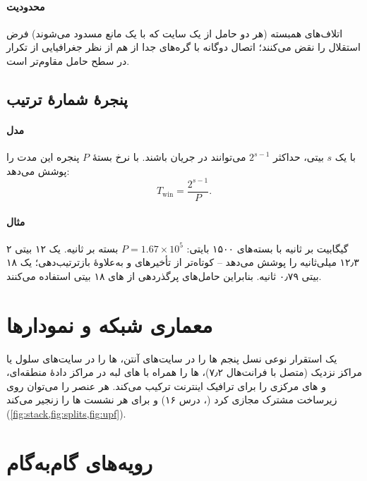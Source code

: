 \documentclass[11pt,a4paper]{article}
\begin{document}
\paragraph{محدودیت} اتلاف‌های همبسته (هر دو حامل از یک سایت که با یک مانع مسدود می‌شوند) فرض استقلال را نقض می‌کنند؛ اتصال دوگانه با گره‌های
جدا از هم از نظر جغرافیایی از تکرار در سطح حامل مقاوم‌تر است.

\subsection{پنجرهٔ شمارهٔ ترتیب}\label{sec:sn}
\paragraph{مدل} با یک  $s$ بیتی، حداکثر $2^{s-1}$  می‌توانند در جریان باشند. با نرخ بستهٔ $P$ پنجره این مدت را پوشش می‌دهد:
\begin{equation}\label{eq:window}
  T_{\mathrm{win}} = \frac{2^{s-1}}{P} .
\end{equation}
\paragraph{مثال} ۲ گیگابیت بر ثانیه با بسته‌های ۱۵۰۰ بایتی: $P = 1.67\times10^5$ بسته بر ثانیه. یک  ۱۲ بیتی ۱۲٫۳ میلی‌ثانیه را پوشش می‌دهد
-- کوتاه‌تر از تأخیرهای  و  به‌علاوهٔ بازترتیب‌دهی؛ یک  ۱۸ بیتی ۰٫۷۹ ثانیه. بنابراین حامل‌های پرگذردهی از های ۱۸
بیتی استفاده می‌کنند.

\section{معماری شبکه و نمودارها}
یک استقرار نوعی نسل پنجم ها را در سایت‌های آنتن، ها را در سایت‌های سلول یا مراکز نزدیک (متصل با فرانت‌هال ۷٫۲)، ها را
همراه با های لبه در مراکز دادهٔ منطقه‌ای، و های مرکزی را برای ترافیک اینترنت ترکیب می‌کند. هر عنصر را می‌توان روی زیرساخت
مشترک مجازی کرد (، درس ۱۶) و  برای هر نشست ها را زنجیر می‌کند (\cref{fig:stack,fig:splits,fig:upf}).

\section{رویه‌های گام‌به‌گام}
\end{document}
